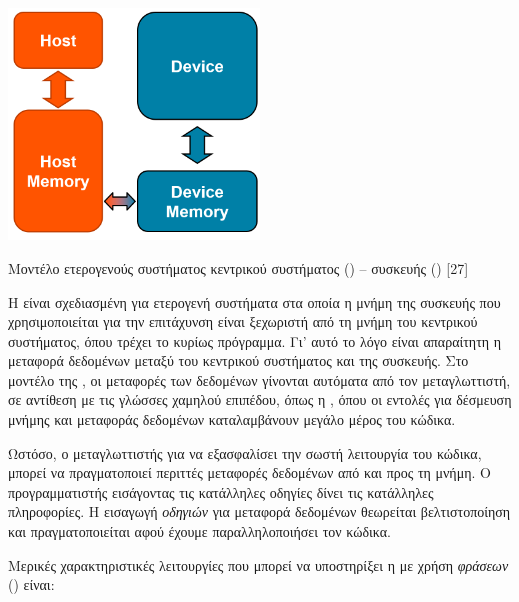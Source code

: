 \begin{Illustration}[!h] 
	\centering
	\includegraphics[width=0.5\textwidth]{images/image058.png} 
	\caption{Μοντέλο ετερογενούς συστήματος κεντρικού συστήματος () – συσκευής () [27]}
	\label{image-3.15}
\end{Illustration}


H  είναι σχεδιασμένη για ετερογενή συστήματα στα οποία η μνήμη της συσκευής που χρησιμοποιείται για την επιτάχυνση είναι ξεχωριστή από τη μνήμη του κεντρικού συστήματος, όπου τρέχει το κυρίως πρόγραμμα. Γι’ αυτό το λόγο είναι απαραίτητη η μεταφορά δεδομένων μεταξύ του κεντρικού συστήματος και της συσκευής. Στο μοντέλο της , οι μεταφορές των δεδομένων γίνονται αυτόματα από τον μεταγλωττιστή, σε αντίθεση με τις γλώσσες χαμηλού επιπέδου, όπως η , όπου οι εντολές για δέσμευση μνήμης και μεταφοράς δεδομένων καταλαμβάνουν μεγάλο μέρος του κώδικα. 

Ωστόσο, ο μεταγλωττιστής για να εξασφαλίσει την σωστή λειτουργία του κώδικα, μπορεί να πραγματοποιεί περιττές μεταφορές δεδομένων από και προς τη μνήμη. Ο προγραμματιστής εισάγοντας τις κατάλληλες οδηγίες δίνει τις κατάλληλες πληροφορίες. Η εισαγωγή \textit{οδηγιών} για μεταφορά δεδομένων θεωρείται βελτιστοποίηση και πραγματοποιείται αφού έχουμε παραλληλοποιήσει τον κώδικα. 

Μερικές χαρακτηριστικές λειτουργίες που μπορεί να υποστηρίξει η  με χρήση \textit{φράσεων} () είναι: 

